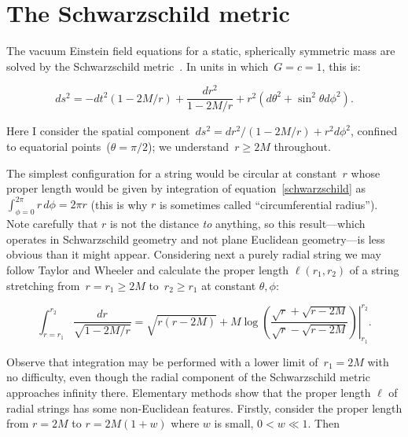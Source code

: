\documentclass{ws-tpe}
\begin{document}
\section{The Schwarzschild metric}

The vacuum Einstein field equations for a static, spherically
symmetric mass are solved by the Schwarzschild
metric~\cite{schwarzschild1916}.  In units in which~$G=c=1$, this is:

\begin{equation}\label{schwarzschild}
ds^2= -dt^2\left(1-2M/r\right) +\frac{dr^2}{1-2M/r} + r^2\left(d\theta^2 + \sin^2\theta d\phi^2\right).
\end{equation}

\noindent Here I consider the spatial component~$ds^2=
dr^2/\left(1-2M/r\right) + r^2d\phi^2$, confined to equatorial
points~($\theta=\pi/2$); we understand~$r\geqslant 2M$ throughout.

The simplest configuration for a string would be circular at
constant~$r$ whose proper length would be given by integration of
equation~\ref{schwarzschild} as~$\int_{\phi=0}^{2\pi}r\,d\phi=2\pi r$
(this is why $r$ is sometimes called ``circumferential radius'').
Note carefully that $r$ is not the distance {\em to} anything, so this
result---which operates in Schwarzschild geometry and not plane
Euclidean geometry---is less obvious than it might appear.
Considering next a purely radial string we may follow Taylor and
Wheeler \cite{taylor2000} and calculate the proper length
$\ell\left(r_1,r_2\right)$ of a string stretching from~$r=r_1\geqslant
2M$ to~$r_2\geqslant r_1$ at constant $\theta,\phi$:



\begin{equation}\label{radial_string_length}
  \int_{r=r_1}^{r_2}\frac{dr}{\sqrt{1-2M/r}}=
  \left.
  \sqrt{r(r-2M)} +M\log\left(
  \frac{\sqrt{r}+\sqrt{r-2M}}{\sqrt{r}-\sqrt{r-2M}}\right)
  \right|_{r_1}^{r_2}.
  \end{equation}

Observe that integration may be performed with a lower limit
of~$r_1=2M$ with no difficulty, even though the radial component of
the Schwarzschild metric approaches infinity there.  Elementary
methods show that the proper length $\ell$ of radial strings has some
non-Euclidean features.  Firstly, consider the proper length from
$r=2M$ to $r=2M(1+w)$ where $w$ is small, $0<w\ll 1$.  Then
\end{document}
